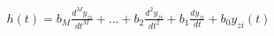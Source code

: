\documentclass[preview]{standalone}
\begin{document}
\begin{align*}
h(t) = b_M\frac{d^My_{zi}}{dt^M} +...+b_2\frac{d^2y_{zi}}{dt^2}+b_1\frac{dy_{zi}}{dt} + b_0y_{zi}(t)
\end{align*}
\end{document}
